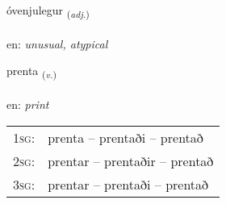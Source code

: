 \documentclass[frontgrid, backgrid]{flacards}\usepackage[]{graphicx}\usepackage[]{xcolor}
\begin{document}
\renewcommand{\flhead}{\vskip5pt \fboxsep=0pt {\small\bfseries\footnotesize Lýsingarorð | Adjective}}
\renewcommand{\fcfoot}{\vskip5pt \fboxsep=0pt \hspace{2pt}{\small\bfseries\footnotesize 3K}}

\renewcommand{\blhead}{\vskip5pt {\small\bfseries\footnotesize Lýsingarorð | Adjective }}
\renewcommand{\bcfoot}{\vskip5pt \hspace{2pt}{\small\bfseries\footnotesize 3K}}


{óvenjulegur \small{\textsubscript{(\textit{adj.})}} \\[1ex] %
\textphonetic{[ouːvɛnjʏlɛɣʏr]} \\
en: \emph{unusual, atypical} \\  [2ex]
\renewcommand*{\arraystretch}{0.8}
}

\renewcommand{\flhead}{\vskip5pt \fboxsep=0pt {\small\bfseries\footnotesize Sagnorð | Verb}}
\renewcommand{\fcfoot}{\vskip5pt \fboxsep=0pt \hspace{2pt}{\small\bfseries\footnotesize 3K}}

\renewcommand{\blhead}{\vskip5pt {\small\bfseries\footnotesize Sagnorð | Verb }}
\renewcommand{\bcfoot}{\vskip5pt \hspace{2pt}{\small\bfseries\footnotesize 3K}}


{prenta \small{\textsubscript{(\textit{v.})}} \\[1ex] %
\textphonetic{[pʰrɛn̥ta]} \\
en: \emph{print} \\  [2ex]
\renewcommand*{\arraystretch}{0.8}
\begin{tabular}{p{1cm}l}
\textsc{1sg}: & prenta -- prentaði -- prentað \\ 
\textsc{2sg}: & prentar -- prentaðir -- prentað \\ 
\textsc{3sg}: & prentar -- prentaði -- prentað \\ 
\end{tabular}
}
\end{document}
